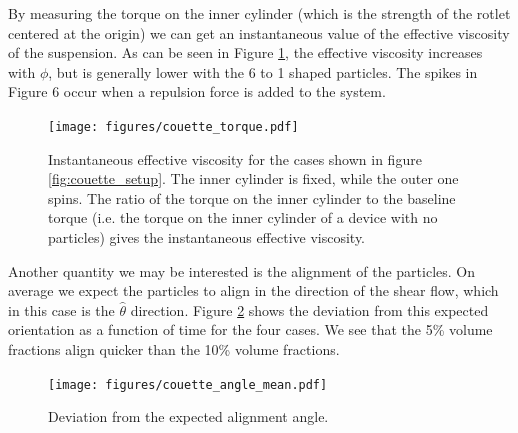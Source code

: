 \documentclass[preprint, 10pt]{elsarticle}
\begin{document}
By measuring the torque on the inner cylinder (which is the strength of the rotlet centered at the origin) we can get an instantaneous value of the effective viscosity of the suspension. As can be seen in Figure \ref{fig:torque}, the effective viscosity increases with $\phi$, but is generally lower with the 6 to 1 shaped particles. The spikes in Figure 6 occur when a repulsion force is added to the system. 
\begin{figure}[!h]
\begin{center}
\texttt{[image: figures/couette\_torque.pdf]}\\
\end{center}
\caption{Instantaneous effective viscosity for the cases shown in figure \ref{fig:couette_setup}. The inner cylinder is fixed, while the outer one spins. The ratio of the torque on the inner cylinder to the baseline torque (i.e. the torque on the inner cylinder of a device with no particles) gives the instantaneous effective viscosity.}\label{fig:torque}
\end{figure} 

Another quantity we may be interested is the alignment of the particles. On average we expect the particles to align in the direction of the shear flow, which in this case is the $\hat{\theta}$ direction. Figure \ref{fig:angles} shows the deviation from this expected orientation as a function of time for the four cases. We see that the 5\% volume fractions align quicker than the 10\% volume fractions. 

\begin{figure}[!h]
\begin{center}
\texttt{[image: figures/couette\_angle\_mean.pdf]}\\
\end{center}
\caption{Deviation from the expected alignment angle. }\label{fig:angles}
\end{figure} 



\end{document}
